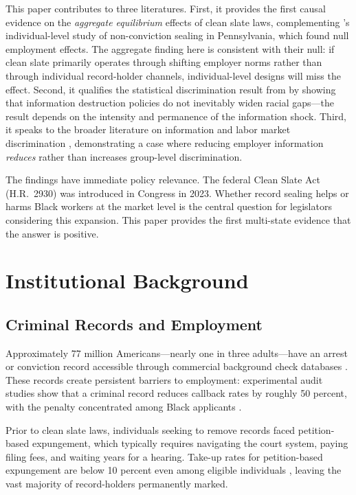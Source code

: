 \documentclass[12pt]{article}
\begin{document}
This paper contributes to three literatures. First, it provides the first causal evidence on the \emph{aggregate equilibrium} effects of clean slate laws, complementing \citet{agan2024}'s individual-level study of non-conviction sealing in Pennsylvania, which found null employment effects. The aggregate finding here is consistent with their null: if clean slate primarily operates through shifting employer norms rather than through individual record-holder channels, individual-level designs will miss the effect. Second, it qualifies the statistical discrimination result from \citet{doleac2020} by showing that information destruction policies do not inevitably widen racial gaps---the result depends on the intensity and permanence of the information shock. Third, it speaks to the broader literature on information and labor market discrimination \citep{arrow1973,phelps1972,aigner1977}, demonstrating a case where reducing employer information \emph{reduces} rather than increases group-level discrimination.

The findings have immediate policy relevance. The federal Clean Slate Act (H.R.~2930) was introduced in Congress in 2023. Whether record sealing helps or harms Black workers at the market level is the central question for legislators considering this expansion. This paper provides the first multi-state evidence that the answer is positive.

\section{Institutional Background}

\subsection{Criminal Records and Employment}

Approximately 77 million Americans---nearly one in three adults---have an arrest or conviction record accessible through commercial background check databases \citep{umich2024}. These records create persistent barriers to employment: experimental audit studies show that a criminal record reduces callback rates by roughly 50 percent, with the penalty concentrated among Black applicants \citep{pager2003,agan2018}.

Prior to clean slate laws, individuals seeking to remove records faced petition-based expungement, which typically requires navigating the court system, paying filing fees, and waiting years for a hearing. Take-up rates for petition-based expungement are below 10 percent even among eligible individuals \citep{prescott2020}, leaving the vast majority of record-holders permanently marked.
\end{document}
